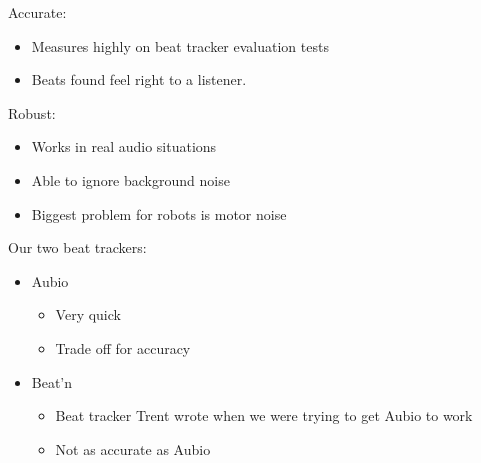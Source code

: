 \documentclass{beamer}
\begin{document}
	\begin{frame}
		Accurate:
		\begin{itemize}
			\item Measures highly on beat tracker evaluation tests
			\item Beats found feel right to a listener.	
		\end{itemize}		
	\end{frame}
	\begin{frame}
		Robust:
		\begin{itemize}
			\item Works in real audio situations
			\item Able to ignore background noise
			\item Biggest problem for robots is motor noise
		\end{itemize}		
	\end{frame}
	\begin{frame}
		Our two beat trackers:
		\begin{itemize}
			\item Aubio
				\begin{itemize}
					\item Very quick
					\item Trade off for accuracy
				\end{itemize}
			\item Beat'n
				\begin{itemize}
					\item Beat tracker Trent wrote when we were trying to get Aubio to work
					\item Not as accurate as Aubio
				\end{itemize}
		\end{itemize}		
	\end{frame}
\end{document}
